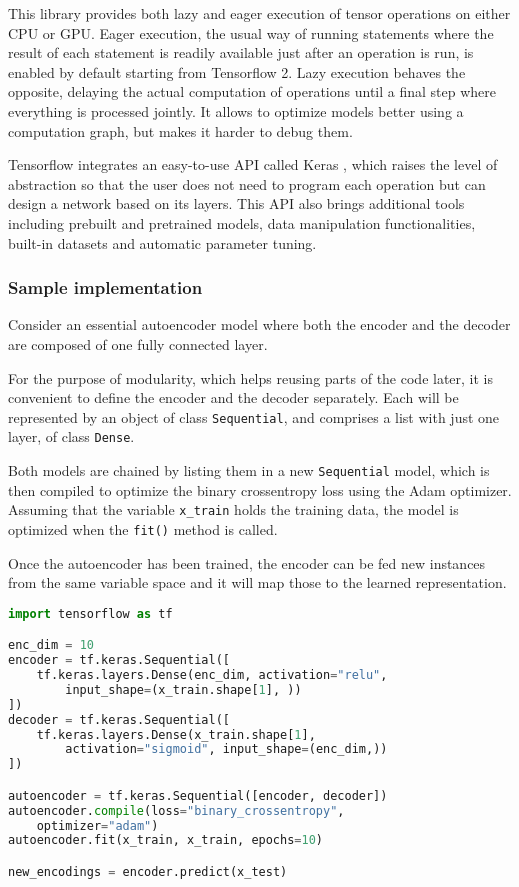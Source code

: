 This library provides both lazy and eager execution of tensor operations on either CPU or GPU. Eager execution, the usual way of running statements where the result of each statement is readily available just after an operation is run, is enabled by default starting from Tensorflow 2. Lazy execution behaves the opposite, delaying the actual computation of operations until a final step where everything is processed jointly. It allows to optimize models better using a computation graph, but makes it harder to debug them.

Tensorflow integrates an easy-to-use API called Keras , which raises the level of abstraction so that the user does not need to program each operation but can design a network based on its layers. This API also brings additional tools including prebuilt and pretrained models, data manipulation functionalities, built-in datasets and automatic parameter tuning.

\subsubsection{Sample implementation}

Consider an essential autoencoder model where both the encoder and the decoder are composed of one fully connected layer. 

For the purpose of modularity, which helps reusing parts of the code later, it is convenient to define the encoder and the decoder separately. Each will be represented by an object of class \texttt{Sequential}, and comprises a list with just one layer, of class \texttt{Dense}. 

Both models are chained by listing them in a new \texttt{Sequential} model, which is then compiled to optimize the binary crossentropy loss using the Adam  optimizer. Assuming that the variable \texttt{x\_train} holds the training data, the model is optimized when the \texttt{fit()} method is called.

Once the autoencoder has been trained, the encoder can be fed new instances from the same variable space and it will map those to the learned representation.

\begin{lstlisting}[language=Python]
import tensorflow as tf

enc_dim = 10
encoder = tf.keras.Sequential([
    tf.keras.layers.Dense(enc_dim, activation="relu", 
        input_shape=(x_train.shape[1], ))
])
decoder = tf.keras.Sequential([
    tf.keras.layers.Dense(x_train.shape[1], 
        activation="sigmoid", input_shape=(enc_dim,))
])

autoencoder = tf.keras.Sequential([encoder, decoder])
autoencoder.compile(loss="binary_crossentropy", 
    optimizer="adam")
autoencoder.fit(x_train, x_train, epochs=10)

new_encodings = encoder.predict(x_test)
\end{lstlisting}

